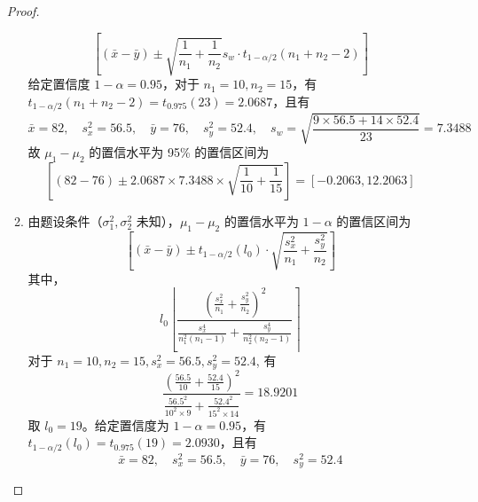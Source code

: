 \documentclass[normal,founder,mtpro2,cn]{elegantnote}
\begin{document}
\begin{enumerate}
\begin{proof}
\begin{enumerate}
\begin{equation*}
                          \left[\left(\bar{x}-\bar{y}\right) \pm \sqrt{\frac{1}{n_{1}}+\frac{1}{n_{2}}}s_{w}\cdot t_{1-\alpha/2}\left(n_{1}+n_{2}-2\right)\right]
                      \end{equation*}
                      给定置信度 $1-\alpha=0.95$，对于 $n_{1}=10,n_{2}=15$，有 $t_{1-\alpha/2}\left(n_{1}+n_{2}-2\right)=t_{0.975}(23)=2.0687$，且有
                      \begin{equation*}
                          \bar{x}=82,\quad s_{x}^{2}=56.5,\quad \bar{y}=76,\quad s_{y}^{2}=52.4,\quad s_{w}=\sqrt{\frac{9\times 56.5+14 \times 52.4}{23}}=7.3488
                      \end{equation*}
                      故 $\mu_{1}-\mu_{2}$ 的置信水平为 95\% 的置信区间为
                      \begin{equation*}
                          \left[\left(82-76\right) \pm 2.0687 \times 7.3488 \times \sqrt{\frac{1}{10}+\frac{1}{15}}\right]=[-0.2063,12.2063]
                      \end{equation*}
                \item 由题设条件（$\sigma_{1}^{2},\sigma_{2}^{2}$ 未知），$\mu_{1}-\mu_{2}$ 的置信水平为 $1-\alpha$ 的置信区间为
                      \begin{equation*}
                          \left[\left(\bar{x}-\bar{y}\right) \pm t_{1-\alpha/2}\left(l_{0}\right)\cdot\sqrt{\frac{s_{x}^{2}}{n_{1}}+\frac{s_{y}^{2}}{n_{2}}}\right]
                      \end{equation*}
                      其中，
                      \begin{equation*}
                          l_{0}\left\lfloor\frac{\left(\frac{s_{x}^{2}}{n_{1}}+\frac{s_{y}^{2}}{n_{2}}\right)^{2}}{\frac{s_{x}^{4}}{n_{1}^{2}\left(n_{1}-1\right)}+\frac{s_{y}^{4}}{n_{2}^{2}\left(n_{2}-1\right)}}\right\rceil
                      \end{equation*}
                      对于 $n_{1}=10,n_{2}=15,s_{x}^{2}=56.5,s_{y}^{2}=52.4$, 有
                      \begin{equation*}
                          \frac{\left(\frac{56.5}{10}+\frac{52.4}{15}\right)^{2}}{\frac{56.5^{2}}{10^{2}\times 9}+\frac{52.4^{2}}{15^{2}\times 14}}=18.9201
                      \end{equation*}
                      取 $l_{0}=19$。给定置信度为 $1-\alpha=0.95$，有 $t_{1-\alpha/2}\left(l_{0}\right)=t_{0.975}(19)=2.0930$，且有
                      \begin{equation*}
                          \bar{x}=82,\quad s_{x}^{2}=56.5,\quad \bar{y}=76,\quad s_{y}^{2}=52.4

\end{equation*}
\end{enumerate}
\end{proof}
\end{enumerate}
\end{document}

